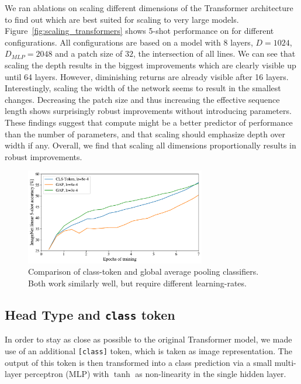 We ran ablations on scaling different dimensions of the Transformer architecture to find out which are best suited for scaling to very large models. Figure~\ref{fig:scaling_transformers} shows 5-shot performance on \imagenet for different configurations. All configurations are based on a \oursabbrv model with $8$ layers, $D=1024$, $D_{MLP}=2048$ and a patch size of $32$, the intersection of all lines. We can see that scaling the depth results in the biggest improvements which are clearly visible up until 64 layers. However, diminishing returns are already visible after 16 layers. Interestingly, scaling the width of the network seems to result in the smallest changes. Decreasing the patch size and thus increasing the effective sequence length shows surprisingly robust improvements without introducing parameters. These findings suggest that compute might be a better predictor of performance than the number of parameters, and that scaling should emphasize depth over width if any. Overall, we find that scaling all dimensions proportionally results in robust improvements.

\begin{figure}[t]
\begin{center}
\includegraphics[width=0.7\textwidth]{images/head_tokens}
\end{center}
\caption{Comparison of class-token and global average pooling classifiers. Both work similarly well, but require different learning-rates.}
\label{fig:head_tokens}
\end{figure}

\subsection{Head Type and \texttt{class} token}
\label{app:head_types}
In order to stay as close as possible to the original Transformer model, we made use of an additional \texttt{[class]} token, which is taken as image representation. The output of this token is then transformed into a class prediction via a small multi-layer perceptron (MLP) with $\tanh$ as non-linearity in the single hidden layer.

